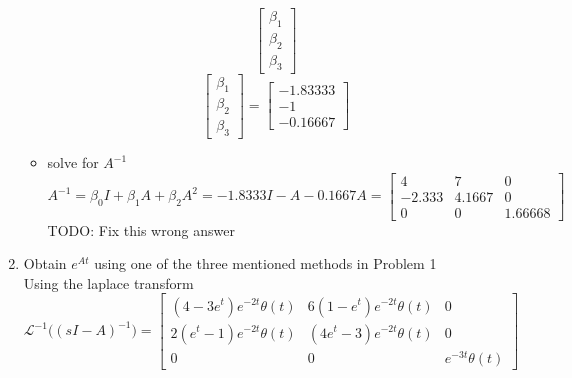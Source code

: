 \begin{enumerate}
\begin{itemize}
\begin{equation}
\begin{bmatrix}
          \beta_1 \\
          \beta_2 \\
          \beta_3 
        \end{bmatrix}
      \end{equation}
      \begin{equation}
        \begin{bmatrix}
          \beta_1 \\
          \beta_2 \\
          \beta_3 
        \end{bmatrix} = 
        \begin{bmatrix}
          -1.83333 \\
          -1 \\
          -0.16667
        \end{bmatrix}
      \end{equation}
    \item solve for $A^{-1}$
      \begin{equation}
        A^{-1} =
        \beta_0I + \beta_1A + \beta_2A^2 =
        -1.8333I - A - 0.1667A =
        \begin{bmatrix}
          4 & 7 & 0 \\
          -2.333 & 4.1667 & 0 \\
          0 & 0 & 1.66668
        \end{bmatrix}
      \end{equation}
      {\LARGE \color{red} TODO: Fix this wrong answer}
    \end{itemize}
  \item Obtain $e^{At}$ using one of the three mentioned methods in Problem 1 \\
    Using the laplace transform
    \begin{equation}
\mathscr{L}^{-1}\Big ((sI-A)^{-1}\Big ) = \left[\begin{matrix}\left(4 - 3 e^{t}\right) e^{- 2 t} \theta\left(t\right) & 6 \left(1 - e^{t}\right) e^{- 2 t} \theta\left(t\right) & 0\\2 \left(e^{t} - 1\right) e^{- 2 t} \theta\left(t\right) & \left(4 e^{t} - 3\right) e^{- 2 t} \theta\left(t\right) & 0\\0 & 0 & e^{- 3 t} \theta\left(t\right)\end{matrix}\right]\end{equation}

  \end{enumerate}